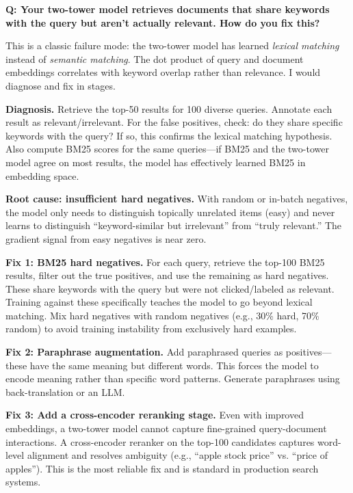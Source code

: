 \begin{interviewq}
\textbf{Q: Your two-tower model retrieves documents that share keywords with the query but aren't actually relevant. How do you fix this?}

 \quad {} \quad \badgefreq{\freqhigh}

\stronganswer

This is a classic failure mode: the two-tower model has learned \textit{lexical matching} instead of \textit{semantic matching}. The dot product of query and document embeddings correlates with keyword overlap rather than relevance. I would diagnose and fix in stages.

\textbf{Diagnosis.} Retrieve the top-50 results for 100 diverse queries. Annotate each result as relevant/irrelevant. For the false positives, check: do they share specific keywords with the query? If so, this confirms the lexical matching hypothesis. Also compute BM25 scores for the same queries---if BM25 and the two-tower model agree on most results, the model has effectively learned BM25 in embedding space.

\textbf{Root cause: insufficient hard negatives.} With random or in-batch negatives, the model only needs to distinguish topically unrelated items (easy) and never learns to distinguish ``keyword-similar but irrelevant'' from ``truly relevant.'' The gradient signal from easy negatives is near zero.

\textbf{Fix 1: BM25 hard negatives.} For each query, retrieve the top-100 BM25 results, filter out the true positives, and use the remaining as hard negatives. These share keywords with the query but were not clicked/labeled as relevant. Training against these specifically teaches the model to go beyond lexical matching. Mix hard negatives with random negatives (e.g., 30\% hard, 70\% random) to avoid training instability from exclusively hard examples.

\textbf{Fix 2: Paraphrase augmentation.} Add paraphrased queries as positives---these have the same meaning but different words. This forces the model to encode meaning rather than specific word patterns. Generate paraphrases using back-translation or an LLM.

\textbf{Fix 3: Add a cross-encoder reranking stage.} Even with improved embeddings, a two-tower model cannot capture fine-grained query-document interactions. A cross-encoder reranker on the top-100 candidates captures word-level alignment and resolves ambiguity (e.g., ``apple stock price'' vs. ``price of apples''). This is the most reliable fix and is standard in production search systems.


\end{interviewq}
